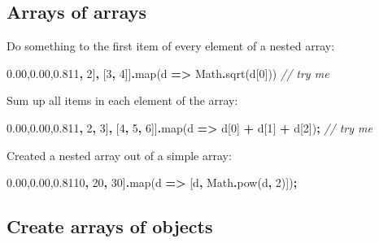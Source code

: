 \documentclass[
  openany]{book}
\newenvironment{Shaded}{\begin{snugshade}}{\end{snugshade}}
\newcommand{\BuiltInTok}[1]{#1}
\newcommand{\CommentTok}[1]{\textcolor[rgb]{0.56,0.35,0.01}{\textit{#1}}}
\newcommand{\DecValTok}[1]{\textcolor[rgb]{0.00,0.00,0.81}{#1}}
\newcommand{\FunctionTok}[1]{\textcolor[rgb]{0.00,0.00,0.00}{#1}}
\newcommand{\KeywordTok}[1]{\textcolor[rgb]{0.13,0.29,0.53}{\textbf{#1}}}
\newcommand{\NormalTok}[1]{#1}
\newcommand{\OperatorTok}[1]{\textcolor[rgb]{0.81,0.36,0.00}{\textbf{#1}}}
\begin{document}
\hypertarget{arrays-of-arrays-1}{%
\subsection{Arrays of arrays}\label{arrays-of-arrays-1}}

Do something to the first item of every element of a nested array:

\begin{Shaded}
\begin{Highlighting}[]
\NormalTok{[[}\DecValTok{1}\OperatorTok{,} \DecValTok{2}\NormalTok{]}\OperatorTok{,}\NormalTok{ [}\DecValTok{3}\OperatorTok{,} \DecValTok{4}\NormalTok{]]}\OperatorTok{.}\FunctionTok{map}\NormalTok{(d }\KeywordTok{=\textgreater{}} \BuiltInTok{Math}\OperatorTok{.}\FunctionTok{sqrt}\NormalTok{(d[}\DecValTok{0}\NormalTok{]))  }\CommentTok{// try me}
\end{Highlighting}
\end{Shaded}

Sum up all items in each element of the array:

\begin{Shaded}
\begin{Highlighting}[]
\NormalTok{[[}\DecValTok{1}\OperatorTok{,} \DecValTok{2}\OperatorTok{,} \DecValTok{3}\NormalTok{]}\OperatorTok{,}\NormalTok{ [}\DecValTok{4}\OperatorTok{,} \DecValTok{5}\OperatorTok{,} \DecValTok{6}\NormalTok{]]}\OperatorTok{.}\FunctionTok{map}\NormalTok{(d }\KeywordTok{=\textgreater{}}\NormalTok{ d[}\DecValTok{0}\NormalTok{] }\OperatorTok{+}\NormalTok{ d[}\DecValTok{1}\NormalTok{] }\OperatorTok{+}\NormalTok{ d[}\DecValTok{2}\NormalTok{])}\OperatorTok{;} \CommentTok{// try me}
\end{Highlighting}
\end{Shaded}

Created a nested array out of a simple array:

\begin{Shaded}
\begin{Highlighting}[]
\NormalTok{[}\DecValTok{10}\OperatorTok{,} \DecValTok{20}\OperatorTok{,} \DecValTok{30}\NormalTok{]}\OperatorTok{.}\FunctionTok{map}\NormalTok{(d }\KeywordTok{=\textgreater{}}\NormalTok{ [d}\OperatorTok{,} \BuiltInTok{Math}\OperatorTok{.}\FunctionTok{pow}\NormalTok{(d}\OperatorTok{,} \DecValTok{2}\NormalTok{)])}\OperatorTok{;}
\end{Highlighting}
\end{Shaded}

\hypertarget{create-arrays-of-objects}{%
\subsection{Create arrays of objects}\label{create-arrays-of-objects}}
\end{document}
